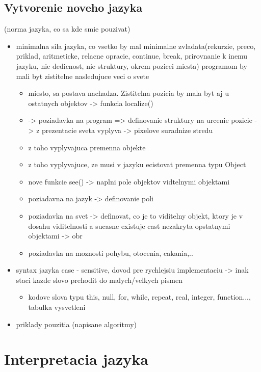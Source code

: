 \documentclass[12pt,notitlepage]{report}
\begin{document}
\subsection{Vytvorenie noveho jazyka} (norma jazyka, co sa kde smie pouzivat)
\begin{itemize}
\item minimalna sila jazyka, co vsetko by mal minimalne zvladata(rekurzie, preco, priklad, aritmeticke, relacne opracie, continue, break, prirovnanie k inemu jazyku, nie dedicnost, nie struktury, okrem pozicei miesta) programom by mali byt zistitelne nasledujuce veci o svete
\begin{itemize}
\item miesto, sa postava nachadza. Zistitelna pozicia by mala byt aj u ostatnych objektov -> funkcia localize()
\item -> poziadavka na program => definovanie struktury na urcenie pozicie -> z prezentacie sveta vyplyva -> pixelove suradnize stredu
\item z toho vyplyvajuca premenna objekte
\item z toho vyplyvajuce, ze musi v jazyku ecistovat premenna typu Object
\item nove funkcie see() -> naplni pole objektov vidtelnymi objektami
\item poziadavna na jazyk -> definovanie poli
\item poziadavka na svet -> definovat, co je to viditelny objekt, ktory je v dosahu viditelnosti a sucasne existuje cast nezakryta opstatnymi objektami -> obr
\item  poziadavka na moznosti pohybu, otocenia, cakania,..
\end{itemize}
\item syntax jazyka
case - sensitive, dovod pre rychlejsiu implementaciu -> inak staci kazde slovo prehodit do malych/velkych pismen
\begin{itemize}
\item kodove slova typu this, null, for, while, repeat, real, integer, function..., tabulka vysvetleni
\end{itemize}
\item priklady pouzitia (napisane algoritmy)
\end{itemize}
\section {Interpretacia jazyka}
\end{document}

